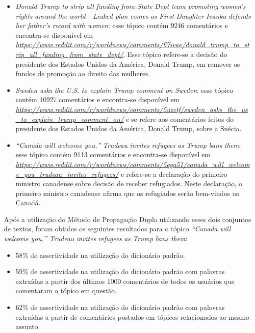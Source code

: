 \begin{itemize}
  \item
  \textit{Donald Trump to strip all funding from State Dept team promoting
  women's rights around the world - Leaked plan comes as First Daughter Ivanka
  defends her father's record with women}: esse tópico contém 9246
  comentários e encontra-se disponível em
  \textit{\url{https://www.reddit.com/r/worldnews/comments/67ivae/donald_trump_to_strip_all_funding_from_state_dept/}}.
  Esse tópico refere-se a decisão do presidente dos Estados Unidos da América,
  Donald Trump, em remover os fundos de promoção ao direito das mulheres.
  \item
  \textit{Sweden asks the U.S. to explain Trump comment on
  Sweden}: esse tópico contém 10927
  comentários e encontra-se disponível em
  \textit{\url{https://www.reddit.com/r/worldnews/comments/5uzetf/sweden_asks_the_us_to_explain_trump_comment_on/}}
  e se refere aos comentários feitos do presidente dos Estados Unidos da
  América, Donald Trump, sobre a Suécia.
  
  \item\textit{“Canada will welcome you,” Trudeau invites refugees as Trump bans
  them}: esse tópico contém 9113
  comentários e encontra-se disponível em
  \textit{\url{https://www.reddit.com/r/worldnews/comments/5qqa51/canada_will_welcome_you_trudeau_invites_refugees/}}
  e refere-se a declaração do primeiro ministro canadense sobre decisão de
  receber refugiados. Neste declaração, o primeiro ministro canadense afirma que
  os refugiados serão bem-vindos no Canadá.
\end{itemize}
 
Após a utilização do Método de Propagação Dupla utilizando esses dois conjuntos
de textos, foram obtidos os seguintes resultados para o tópico \textit{``Canada
will welcome you,” Trudeau invites refugees as Trump bans them}:
\begin{itemize}
  \item 58\% de assertividade na utilização do dicionário padrão.
  \item 59\% de assertividade na utilização do dicionário padrão com palavras
  extraídas a partir dos últimos 1000 comentários de todos os usuários que
  comentaram o tópico em questão.
  \item 62\% de assertividade na utilização do dicionário padrão com palavras
  extraídas a partir de comentários postados em tópicos relacionados ao mesmo
  assunto.
\end{itemize}

